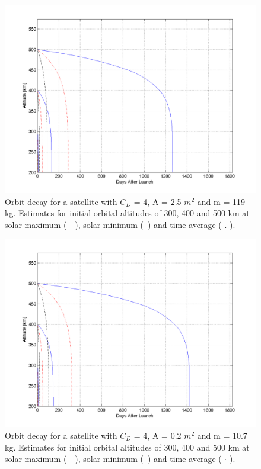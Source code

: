 \begin{figure}[h!]
\centering
\includegraphics[width=0.95\textheight, angle=90]{chapters/img/orbitDecayEmitter.png}
\caption{Orbit decay for a satellite with $C_D$ = 4, A = 2.5 $m^2$ and m = 119 kg. Estimates for initial orbital altitudes of 300, 400 and 500 km at solar maximum (- -), solar minimum (--) and time average (-.-).}
\label{fig:decayEmitter}
\end{figure}

\begin{figure}[h!]
\centering
\includegraphics[width=0.95\textheight, angle=90]{chapters/img/orbitDecayRecieverMin.png}
\caption{Orbit decay for a satellite with $C_D$ = 4, A = 0.2 $m^2$ and m = 10.7 kg. Estimates for initial orbital altitudes of 300, 400 and 500 km at solar maximum (- -), solar minimum (--) and time average (-$\cdot$-).}
\label{fig:decayReceiver}
\end{figure}

